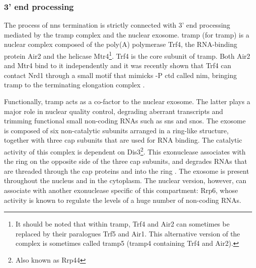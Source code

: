 \subsubsection{3' end processing} \label{secTramp}

The process of \gls{nns} termination is strictly connected with 3' end processing mediated by the \gls{tramp} complex and the nuclear exosome.
\gls{tramp} (for \glsdesc{tramp}) is a nuclear complex composed of the poly(A) polymerase Trf4, the RNA-binding protein Air2 and the helicase Mtr4\footnote{It should be noted that within \gls{tramp}, Trf4 and Air2 can sometimes be replaced by their paralogues Trf5 and Air1. This alternative version of the complex is sometimes called \gls{tramp}5 (\gls{tramp}4 containing Trf4 and Air2).}.
Trf4 is the core subunit of \gls{tramp}.
Both Air2 and Mtr4 bind to it independently and it was recently shown that Trf4 can contact Nrd1 through a small motif that mimicks \serf{}-P \gls{ctd} called \gls{nim}, bringing \gls{tramp} to the terminating elongation complex \cite{tudek:2014:molecular}.

Functionally, \gls{tramp} acts as a co-factor to the nuclear exosome.
The latter plays a major role in nuclear quality control, degrading aberrant transcripts and trimming functional small non-coding RNAs such as \gls{sns} and \gls{snos}.
The exosome is composed of six non-catalytic subunits arranged in a ring-like structure, together with three cap subunits that are used for RNA binding.
The catalytic activity of this complex is dependent on Dis3\footnote{Also known as Rrp44}.
This \TtoF{} exonuclease associates with the ring on the opposite side of the three cap subunits, and degrades RNAs that are threaded through the cap proteins and into the ring \cite{makino:2015:rna}.
The exosome is present throughout the nucleus and in the cytoplasm.
The nuclear version, however, can associate with another exonuclease specific of this compartment: Rrp6, whose activity is known to regulate the levels of a huge number of non-coding RNAs.

